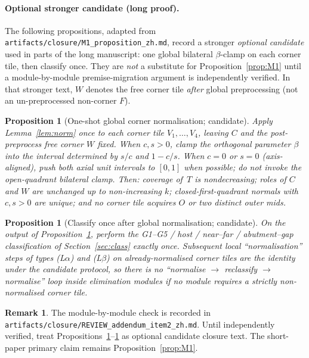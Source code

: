 \documentclass[11pt,reqno]{amsart}
\newtheorem{proposition}[theorem]{Proposition}
\theoremstyle{definition}
\newtheorem{remark}[theorem]{Remark}
\begin{document}
\paragraph{Optional stronger candidate (long proof).}
The following propositions, adapted from
\texttt{artifacts/closure/M1\_proposition\_zh.md}, record a stronger
\emph{optional candidate} used in parts of the long manuscript: one global
bilateral $\beta$-clamp on each corner tile, then classify once.  They are
\emph{not} a substitute for Proposition~\ref{prop:M1} until a module-by-module
premise-migration argument is independently verified.  In that stronger text,
$W$ denotes the free corner tile \emph{after} global preprocessing (not an
un-preprocessed non-corner $F$).

\begin{proposition}[One-shot global corner normalisation; candidate]\label{prop:M11}
Apply Lemma~\ref{lem:norm} once to each corner tile $V_1,\dots,V_4$, leaving
$C$ and the post-preprocess free corner $W$ fixed.  When $c,s>0$, clamp the
orthogonal parameter $\beta$ into the interval determined by $s/c$ and
$1-c/s$.  When $c=0$ or $s=0$ (axis-aligned), push both axial unit intervals
to $[0,1]$ when possible; do not invoke the open-quadrant bilateral clamp.
Then: coverage of~$T$ is nondecreasing; roles of $C$ and $W$ are unchanged up
to non-increasing $k$; closed-first-quadrant normals with $c,s>0$ are unique;
and no corner tile acquires $O$ or two distinct outer mids.
\end{proposition}

\begin{proposition}[Classify once after global normalisation; candidate]\label{prop:M12}
On the output of Proposition~\ref{prop:M11}, perform the G1--G5 / host /
near--far / abutment--gap classification of Section~\ref{sec:class} exactly
once.  Subsequent local ``normalisation'' steps of types (L$\alpha$) and
(L$\beta$) on already-normalised corner tiles are the identity under the
candidate protocol, so there is no ``normalise $\to$ reclassify $\to$
normalise'' loop inside elimination modules \emph{if} no module requires a
strictly non-normalised corner tile.
\end{proposition}

\begin{remark}
The module-by-module check is recorded in
\texttt{artifacts/closure/REVIEW\_addendum\_item2\_zh.md}.  Until independently
verified, treat Propositions~\ref{prop:M11}--\ref{prop:M12} as optional
candidate closure text.  The short-paper primary claim remains
Proposition~\ref{prop:M1}.
\end{remark}
\end{document}
